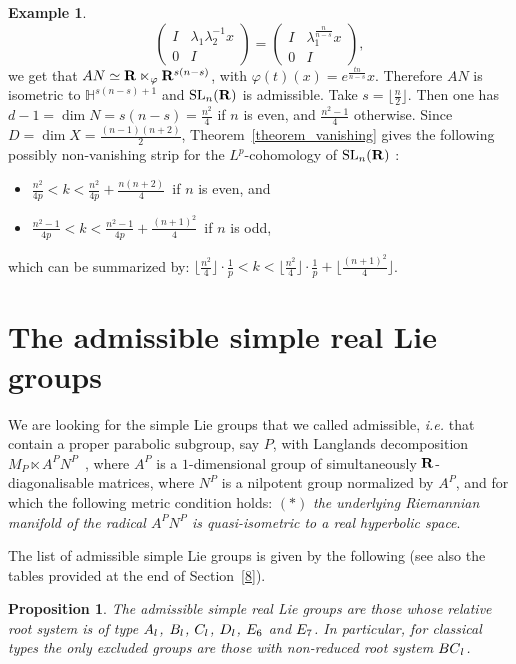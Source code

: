 \documentclass[11pt]{article}
\newtheorem{prop}[theo]{Proposition}
\theoremstyle{definition}
\newtheorem{exam}[theo]{Example}
\numberwithin{equation}{section}
\numberwithin{figure}{section}
\numberwithin{table}{section}
\DeclareMathOperator{\SL}{SL}
\begin{document}
\begin{exam}
\[\begin{pmatrix}
I & \lambda_1 \lambda_2 ^{-1} x \\
0 & I
\end{pmatrix} =
\begin{pmatrix}
I & \lambda_1 ^{\frac{n}{n-s}}x \\
0 & I
\end{pmatrix},
\]
we get that $AN \simeq {\bf R} \ltimes _\varphi {\bf R} ^{s(n-s)}$, with $\varphi (t)(x) = e^{\frac{tn}{n-s}}x$. Therefore $AN$ is isometric to $\mathbb H ^{s(n-s)+1}$ and $\SL_n({\bf R})$ is admissible. Take $s = \lfloor \frac{n}{2} \rfloor$. Then one has $d-1 = \dim N = s(n-s) = \frac{n^2}{4}$ if $n$ is even, and $\frac{n^2-1}{4}$ otherwise. Since $D = \dim X = \frac{(n-1)(n+2)}{2}$, Theorem~\ref{theorem_vanishing} gives the following possibly non-vanishing strip for the $L^p$-cohomology of $\SL_n({\bf R})$ :
\begin{itemize}
\item $\frac{n^2}{4p} < k < \frac{n^2}{4p} + \frac{n(n+2)}{4}$~if $n$ is even, and
\item $\frac{n^2-1}{4p} < k < \frac{n^2-1}{4p} + \frac{(n+1)^2}{4}$~if $n$ is odd,
\end{itemize}
which can be summarized by: $\lfloor \frac{n^2}{4}\rfloor \cdot\frac{1}{p} <k<\lfloor \frac{n^2}{4}\rfloor \cdot\frac{1}{p} + \lfloor \frac{(n+1)^2}{4}\rfloor $.
\end{exam}



\section{The admissible simple real Lie groups}\label{7}

We are looking for the simple Lie groups that we called admissible, \emph{i.e.} that contain a proper parabolic subgroup, say $P$, with Langlands decomposition $M_P \ltimes A^PN^P$~\cite[Proposition~7.83]{Knapp}, where $A^P$ is a $1$-dimensional group of simultaneously ${\bf R}$-diagonalisable matrices, where $N^P$ is a nilpotent group normalized by $A^P$, and for which the following metric condition holds: $(*)$ \emph{the underlying Riemannian manifold of the radical $A^PN^P$ is quasi-isometric to a real hyperbolic space}.

The list of admissible simple Lie groups is given by the following (see also the tables provided at the end of Section~\ref{8}).

\begin{prop}
The admissible simple real Lie groups are those whose relative root system is of type ${\rm A}_l$, ${\rm B}_l$, ${\rm C}_l$, ${\rm D}_l$, ${\rm E}_6$ and ${\rm E}_7$. In particular, for classical types the only excluded groups are those with non-reduced root system ${\rm BC}_l$.
\end{prop}
\end{document}
